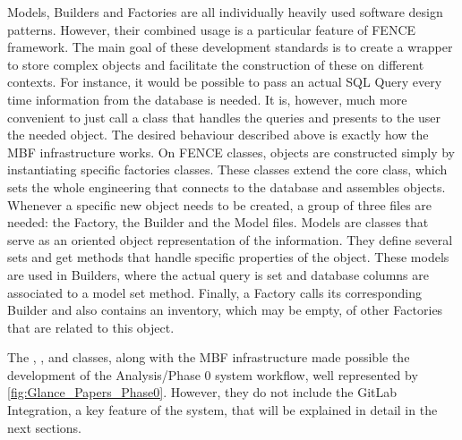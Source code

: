 Models, Builders and Factories are all individually heavily used software design patterns.
However, their combined usage is a particular feature of FENCE framework.
The main goal of these development standards is to create a wrapper to store complex objects and facilitate the construction of these on different contexts.
For instance, it would be possible to pass an actual SQL Query every time information from the database is needed.
It is, however, much more convenient to just call a class that handles the queries and presents to the user the needed object.
The desired behaviour described above is exactly how the MBF infrastructure works. 
On FENCE classes, objects are constructed simply by instantiating specific factories classes.
These classes extend the core  class, which sets the whole engineering that connects to the database and assembles objects.
Whenever a specific new object needs to be created, a group of three files are needed: the Factory, the Builder and the Model files.
Models are classes that serve as an oriented object representation of the information. They define several sets and get methods that handle specific properties of the object. These models are used in Builders, where the actual query is set and database columns are associated to a model set method. Finally, a Factory calls its corresponding Builder and also contains an inventory, which may be empty, of other Factories that are related to this object.

The , ,  and  classes, along with the MBF infrastructure made possible the development of the Analysis/Phase 0 system workflow, well represented by \cref{fig:Glance_Papers_Phase0}.
However, they do not include the GitLab Integration, a key feature of the system, that will be explained in detail in the next sections.

